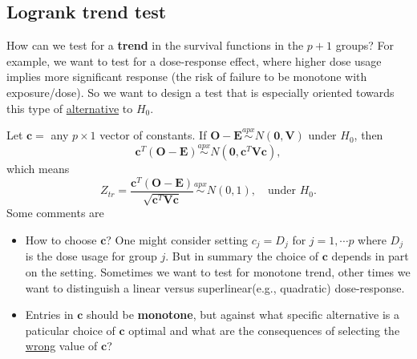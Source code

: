 \documentclass[a4paper,12pt]{article}
\begin{document}
\subsection{Logrank trend test}
\label{sec:logrank-trend-test}


How can we test for a \textbf{trend} in the survival functions in the $p+1$ groups? For example, we want to test for a dose-response effect, where higher dose usage implies more significant response (the risk of failure to be monotone with exposure/dose). So we want to design a test that is especially oriented towards this type of \underline{alternative} to $H_0$.
\par
Let $\bm{c} = $ any $p\times 1$ vector of constants. If $\bm{O} - \bm{E} \overset{apx}{\sim} N\left(\bm{0}, \bm{V}\right)$ under $H_0$, then
\[
  \bm{c}^T\left(\bm{O} - \bm{E}\right)
  \overset{apx}{\sim}
  N\left(\bm{0}, \bm{c}^T\bm{V}\bm{c}\right)
  ,
\]
which means
\[
  Z_{tr} = \frac{
    \bm{c}^T\left(\bm{O} - \bm{E}\right)
  }{
    \sqrt{\bm{c}^T\bm{V}\bm{c}}
  }
  \overset{apx}{\sim}
  N\left(0, 1\right)
  ,\quad\text{under }H_0.
\]
Some comments are
\begin{itemize}
\item How to choose $\bm{c}$? One might consider setting $c_j = D_j$ for $j = 1, \cdots p$ where $D_j$ is the dose usage for group $j$. But in summary the choice of $\bm{c}$ depends in part on the setting. Sometimes we want to test for monotone trend, other times we want to distinguish a linear versus superlinear(e.g., quadratic) dose-response. 
\item Entries in $\bm{c}$ should be \textbf{monotone}, but against what specific alternative is a paticular choice of $\bm{c}$ optimal and what are the consequences of selecting the \underline{wrong} value of $\bm{c}$?
\end{itemize}






\end{document}
